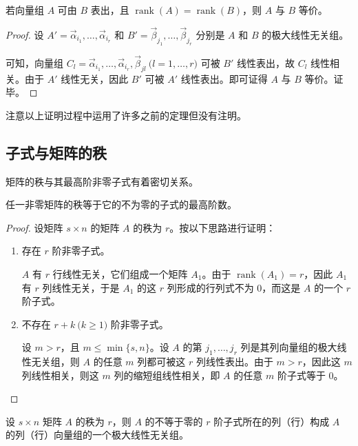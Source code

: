 \begin{theorem}
	若向量组 $A$ 可由 $B$ 表出，且 $\operatorname{rank}(A) = \operatorname{rank}(B)$，则 $A$ 与 $B$ 等价。
\end{theorem}

\begin{proof}
	设 $A' = \vec \alpha_{i_1}, \ldots, \vec \alpha_{i_r}$ 和 $B' = \vec \beta_{j_1}, \ldots, \vec \beta_{j_r}$ 分别是 $A$ 和 $B$ 的极大线性无关组。

	可知，向量组 $C_l = \vec \alpha_{i_1}, \ldots, \vec \alpha_{i_r}, \vec \beta_{jl} \pod{l = 1, \ldots, r}$ 可被 $B'$ 线性表出，故 $C_l$ 线性相关。由于 $A'$ 线性无关，因此 $B'$ 可被 $A'$ 线性表出。即可证得 $A$ 与 $B$ 等价。证毕。
\end{proof}

注意以上证明过程中运用了许多之前的定理但没有注明。

\subsection{子式与矩阵的秩}

矩阵的秩与其最高阶非零子式有着密切关系。

\begin{theorem}
	任一非零矩阵的秩等于它的不为零的子式的最高阶数。
\end{theorem}

\begin{proof}
	设矩阵 $s \times n$ 的矩阵 $A$ 的秩为 $r$。按以下思路进行证明：
	\begin{enumerate}
		\item 存在 $r$ 阶非零子式。

		$A$ 有 $r$ 行线性无关，它们组成一个矩阵 $A_1$。由于 $\operatorname{rank}(A_1) = r$，因此 $A_1$ 有 $r$ 列线性无关，于是 $A_1$ 的这 $r$ 列形成的行列式不为 $0$，而这是 $A$ 的一个 $r$ 阶子式。

		\item 不存在 $r + k \pod{k \ge 1}$ 阶非零子式。

		设 $m > r$，且 $m \le \min\{s, n\}$。设 $A$ 的第 $j_1, \ldots, j_r$ 列是其列向量组的极大线性无关组，则 $A$ 的任意 $m$ 列都可被这 $r$ 列线性表出。由于 $m > r$，因此这 $m$ 列线性相关，则这 $m$ 列的缩短组线性相关，即 $A$ 的任意 $m$ 阶子式等于 $0$。
	\end{enumerate}
\end{proof}


\begin{theorem}
	设 $s \times n$ 矩阵 $A$ 的秩为 $r$，则 $A$ 的不等于零的 $r$ 阶子式所在的列（行）构成 $A$ 的列（行）向量组的一个极大线性无关组。
\end{theorem}

